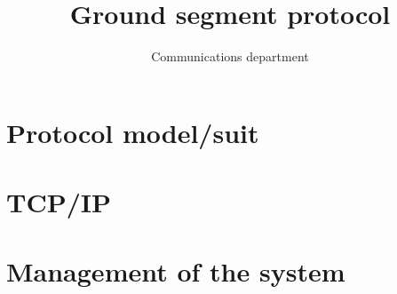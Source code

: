 \documentclass[12pt,a4paper]{article}
\title{Ground segment protocol}
\author{Communications department}
\begin{document}
\maketitle
\section{Protocol model/suit}


\section{TCP/IP}


\section{Management of the system}

\end{document}

